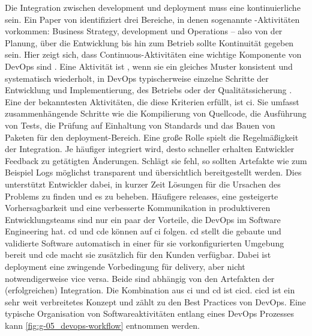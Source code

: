 Die Integration zwischen \Gls{development} und \Gls{deployment} muss eine kontinuierliche sein. Ein Paper von \citeauthor{005:Continous-Software-Engineering-and-Beyond} identifiziert drei Bereiche, in denen sogenannte -Aktivitäten vorkommen: Business Strategy, \Gls{development} und Operations -- also von der Planung, über die Entwicklung bis hin zum Betrieb sollte Kontinuität gegeben sein. \cite{005:Continous-Software-Engineering-and-Beyond} Hier zeigt sich, dass Continuous-Aktivitäten eine wichtige Komponente von DevOps sind \cite{000:CI-CD-Deployment-in-DevOps-reduce-Gap-Developer-Operation}. Eine Aktivität ist , wenn sie ein gleiches Muster konsistent und systematisch wiederholt, in DevOps typischerweise einzelne Schritte der Entwicklung und Implementierung, des Betriebs oder der Qualitätssicherung \cite{007:Analysis-of-Declarative-and-Pull-based-Deployment-Models-on-GitOps}. Eine der bekanntesten Aktivitäten, die diese Kriterien erfüllt, ist \acrfull{ci}. Sie umfasst zusammenhängende Schritte wie die Kompilierung von Quellcode, die Ausführung von Tests, die Prüfung auf Einhaltung von Standards und das Bauen von Paketen für den \Gls{deployment}-Bereich. Eine große Rolle spielt die Regelmäßigkeit der Integration. Je häufiger integriert wird, desto schneller erhalten Entwickler Feedback zu getätigten Änderungen. Schlägt sie fehl, so sollten Artefakte wie zum Beispiel Logs möglichst transparent und übersichtlich bereitgestellt werden. Dies unterstützt Entwickler dabei, in kurzer Zeit Lösungen für die Ursachen des Problems zu finden und es zu beheben. Häufigere \Glspl{release}, eine gesteigerte Vorhersagbarkeit und eine verbesserte Kommunikation in produktiveren Entwicklungsteams sind nur ein paar der Vorteile, die DevOps im Software Engineering hat. \acrfull{cd} und \acrfull{cde} können auf \Gls{ci} folgen. \acrshort{cd} stellt die gebaute und validierte Software automatisch in einer für sie vorkonfigurierten Umgebung bereit und \acrshort{cde} macht sie zusätzlich für den Kunden verfügbar. Dabei ist \Gls{deployment} eine zwingende Vorbedingung für \Gls{delivery}, aber nicht notwendigerweise vice versa. Beide sind abhängig von den Artefakten der (erfolgreichen) Integration. \cite{005:Continous-Software-Engineering-and-Beyond} Die Kombination aus \Gls{ci} und \Gls{cd} ist \acrfull{cicd}. \Gls{cicd} ist ein sehr weit verbreitetes Konzept und zählt zu den Best Practices von DevOps. Eine typische Organisation von Softwareaktivitäten entlang eines DevOps Prozesses kann \autoref{fig:g-05_devops-workflow} entnommen werden.

